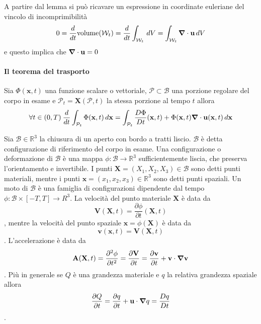 A partire dal lemma si può ricavare un espressione in coordinate euleriane del vincolo di incomprimibilità
\begin{equation}
0 = \frac{d}{dt}\text{volume}(\mathcal{W}_t) = \frac{d}{dt}\int_{\mathcal{W}_t}\,dV = \int_{\mathcal{W}_t} \boldsymbol{\nabla} \cdot \mathbf{u}\,dV
\end{equation}
e questo implica che $\boldsymbol{\nabla} \cdot \mathbf{u} = 0$

\paragraph{Il teorema del trasporto}

\begin{theorem}
	Sia $\Phi(\mathbf{x},t)$ una funzione scalare o vettoriale, $\mathcal{P}\subset\mathcal{B}$ una porzione regolare del corpo in esame e  $\mathcal{P}_t = \mathbf{X}(\mathcal{P},t)$ la stessa porzione al tempo $t$ allora
	$$\forall t \in (0,T)\> \frac{d}{dt}\int_{\mathcal{P}_t}\Phi(\mathbf{x},t)\,d\mathbf{x}=\int_{\mathcal{P}_t}\frac{D\Phi}{Dt}(\mathbf{x},t)+\Phi(\mathbf{x},t)\boldsymbol{\nabla}\cdot\mathbf{u}(\mathbf{x},t)\,d\mathbf{x}$$
\end{theorem}

Sia $\mathcal{B} \in \mathbb{R}^3$ la chiusura di un aperto con bordo a tratti liscio. $\mathcal{B}$ è detta configurazione di riferimento del corpo in esame.
Una configurazione o deformazione di $\mathcal{B}$ è una mappa $\phi: \mathcal{B} \to \mathbb{R}^3$ sufficientemente liscia, che preserva l'orientamento e invertibile. I punti $\mathbf{X}=(X_1,X_2,X_3) \in \mathcal{B}$ sono detti punti materiali, mentre i punti $\mathbf{x}=(x_1,x_2,x_3) \in \mathbb{R}^3$ sono detti punti spaziali. 
Un moto di $\mathcal{B}$ è una famiglia di configurazioni dipendente dal tempo $\phi: \mathcal{B} \times [-T,T] \to R^3$.
La velocità del punto materiale $\mathbf{X}$ è data da 
$$\mathbf{V}(\mathbf{X},t) = \frac{\partial \phi}{\partial t}(\mathbf{X},t)$$,
mentre la velocità del punto spaziale $\mathbf{x}=\phi(\mathbf{X})$ è data da
$$\mathbf{v}(\mathbf{x},t) = \mathbf{V}(\mathbf{X},t)$$.
L'accelerazione è data da
$$\mathbf{A}(\mathbf{X},t) = \frac{\partial^2 \phi}{\partial t^2} = \frac{\partial \mathbf{V}}{\partial t} = \frac{\partial \mathbf{v}}{\partial t}+\mathbf{v}\cdot\boldsymbol{\nabla}\mathbf{v}$$.
Più in generale se $Q$ è una grandezza materiale e $q$ la relativa grandezza spaziale allora 
$$
\frac{\partial Q}{\partial t} = \frac{\partial q}{\partial t} + \mathbf{u}\cdot\boldsymbol{\nabla} q = \frac{Dq}{Dt}
$$.

